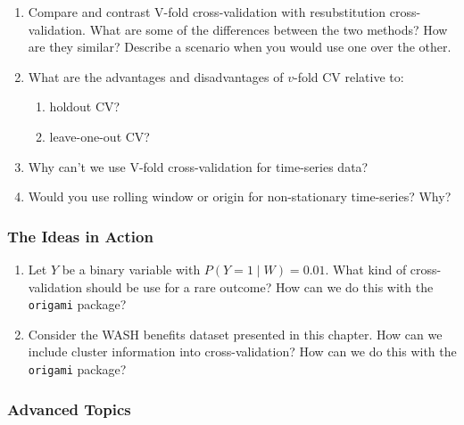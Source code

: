 \documentclass[12pt, krantz2,]{krantz}
\providecommand{\tightlist}{%
  \setlength{\itemsep}{0pt}\setlength{\parskip}{0pt}}
\theoremstyle{definition}
\theoremstyle{definition}
\theoremstyle{definition}
\newcommand{\1}{\mathbbm{1}}
\begin{document}
\begin{enumerate}
\def\labelenumi{\arabic{enumi}.}
\item
  Compare and contrast V-fold cross-validation with resubstitution
  cross-validation. What are some of the differences between the two methods?
  How are they similar? Describe a scenario when you would use one over the
  other.
\item
  What are the advantages and disadvantages of \(v\)-fold CV relative to:

  \begin{enumerate}
  \def\labelenumii{\alph{enumii}.}
  \tightlist
  \item
    holdout CV?
  \item
    leave-one-out CV?
  \end{enumerate}
\item
  Why can't we use V-fold cross-validation for time-series data?
\item
  Would you use rolling window or origin for non-stationary time-series? Why?
\end{enumerate}

\hypertarget{the-ideas-in-action}{%
\subsubsection{The Ideas in Action}\label{the-ideas-in-action}}

\begin{enumerate}
\def\labelenumi{\arabic{enumi}.}
\item
  Let \(Y\) be a binary variable with \(P(Y=1 \mid W) = 0.01\). What kind of
  cross-validation should be use for a rare outcome? How can we do this with
  the \texttt{origami} package?
\item
  Consider the WASH benefits dataset presented in this chapter. How can we
  include cluster information into cross-validation? How can we do this with
  the \texttt{origami} package?
\end{enumerate}

\hypertarget{advanced-topics}{%
\subsubsection{Advanced Topics}\label{advanced-topics}}
\end{document}
